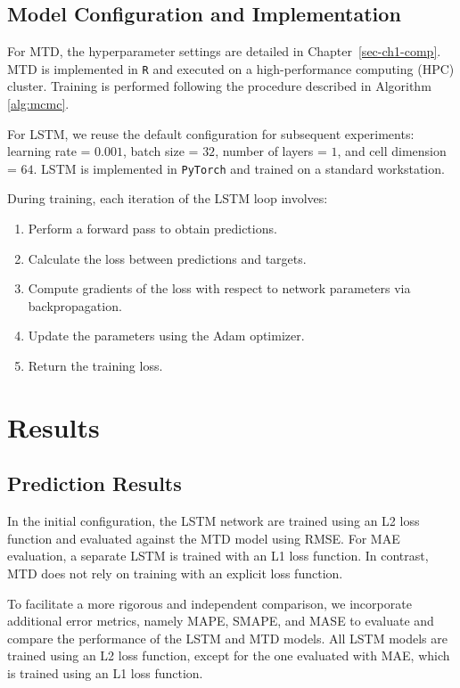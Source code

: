 \documentclass[
  letterpaper,
  double,
  12pt,
  1.0in]{beavtex}
\begin{document}
\subsection{Model Configuration and
Implementation}\label{model-configuration-and-implementation}

For MTD, the hyperparameter settings are detailed in
Chapter~\ref{sec-ch1-comp}. MTD is implemented in \texttt{R} and
executed on a high-performance computing (HPC) cluster. Training is
performed following the procedure described in Algorithm \ref{alg:mcmc}.

For LSTM, we reuse the default configuration for subsequent experiments:
learning rate = \(0.001\), batch size = \(32\), number of layers =
\(1\), and cell dimension = \(64\). LSTM is implemented in
\texttt{PyTorch} and trained on a standard workstation.

During training, each iteration of the LSTM loop involves:

\begin{enumerate}
\def\labelenumi{\arabic{enumi}.}
\item
  Perform a forward pass to obtain predictions.
\item
  Calculate the loss between predictions and targets.
\item
  Compute gradients of the loss with respect to network parameters via
  backpropagation.
\item
  Update the parameters using the Adam optimizer.
\item
  Return the training loss.
\end{enumerate}

\section{Results}\label{results}

\subsection{Prediction Results}\label{prediction-results}

In the initial configuration, the LSTM network are trained using an L2
loss function and evaluated against the MTD model using RMSE. For MAE
evaluation, a separate LSTM is trained with an L1 loss function. In
contrast, MTD does not rely on training with an explicit loss function.

To facilitate a more rigorous and independent comparison, we incorporate
additional error metrics, namely MAPE, SMAPE, and MASE to evaluate and
compare the performance of the LSTM and MTD models. All LSTM models are
trained using an L2 loss function, except for the one evaluated with
MAE, which is trained using an L1 loss function.
\end{document}
